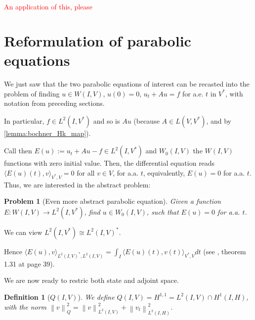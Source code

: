 \documentclass[english,a4paper,10pt,oneside]{scrbook}	%
\theoremstyle{break}
\newtheorem{defn}[equation]{Definition}
\newtheorem{pb}[equation]{Problem}
\theoremstyle{remark}
\newcommand{\norm}[1]{\left\lVert#1\right\rVert}
\begin{document}
\textcolor{red}{An application of this, please}

\section{Reformulation of parabolic equations}

We just saw that the two parabolic equations of interest can be recasted into the problem of finding $u\in W(I,V)$, $u(0)=0$, $u_t+Au=f$ for a.e. $t$ in $V^*$, with notation from preceding sections.

In particular, $f \in L^2(I, V^*)$ and so is $Au$ (because $A\in L(V,V^*)$, and by \ref{lemma:bochner_Hk_map}).

Call then $E(u):=u_t+Au-f \in L^2(I,V^*)$ and $W_0(I,V)$ the $W(I,V)$ functions with zero initial value. Then, the differential equation reads $\langle E(u)(t),v\rangle_{V^*,V}=0$ for all $v\in V$, for a.a. $t$, equivalently, $E(u)=0$ for a.a. $t$. Thus, we are interested in the abstract problem:

\begin{pb}[Even more abstract parabolic equation]
\label{pb:more_abstr_par}
Given a function $E: W(I,V)\rightarrow L^2(I,V^*)$, find $u\in W_0(I,V)$, such that $E(u)=0$ for a.a. $t$.
\end{pb}
 
We can view $L^2(I,V^*)\cong L^2(I,V)^*$.

Hence $\langle E(u), v\rangle_{L^2(I,V)^*, L^2(I,V)}=\int_I \langle E(u)(t),v(t) \rangle_{V^*,V} dt$ (see \cite{hinze}, theorem 1.31 at page 39).

\color{black}


We are now ready to restric both state and adjoint space.

\begin{defn}[$Q(I,V)$]
We define $Q(I,V)=H^{1,1}=L^2(I,V)\cap H^1(I,H)$, with the norm $\norm{v}_Q^2=\norm{v}_{L^2(I,V)}^2 + \norm{v_t}_{L^2(I,H)}^2$.
\end{defn}
\end{document}
